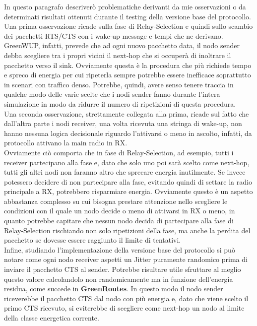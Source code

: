 In questo paragrafo descriverò problematiche derivanti da mie osservazioni o da determinati risultati ottenuti durante il testing della versione base del protocollo.\\

Una prima osservazione ricade sulla fase di Relay-Selection e quindi sullo scambio dei pacchetti RTS/CTS con i wake-up message e tempi che ne derivano. GreenWUP, infatti, prevede che ad ogni nuovo pacchetto data, il nodo sender debba scegliere tra i propri vicini il next-hop che si occuperà di inoltrare il pacchetto verso il sink. Ovviamente questa è la procedura che più richiede tempo e spreco di energia per cui ripeterla sempre potrebbe essere inefficace soprattutto in scenari con traffico denso. Potrebbe, quindi, avere senso tenere traccia in qualche modo delle varie scelte che i nodi sender fanno durante l'intera simulazione in modo da ridurre il numero di ripetizioni di questa procedura.\\

Una seconda osservazione, strettamente collegata alla prima, ricade sul fatto che dall'altra parte i nodi receiver, una volta ricevuta una stringa di wake-up, non hanno nessuna logica decisionale riguardo l'attivarsi o meno in ascolto, infatti, da protocollo attivano la main radio in RX.\\
Ovviamente ciò comporta che in fase di Relay-Selection, ad esempio, tutti i receiver partecipano alla fase e, dato che solo uno poi sarà scelto come next-hop, tutti gli altri nodi non faranno altro che sprecare energia inutilmente. Se invece potessero decidere di non partecipare alla fase, evitando quindi di settare la radio principale a RX, potrebbero risparmiare energia. Ovviamente questo è un aspetto abbastanza complesso su cui bisogna prestare attenzione nello scegliere le condizioni con il quale un nodo decide o meno di attivarsi in RX o meno, in quanto potrebbe capitare che nessun nodo decida di partecipare alla fase di Relay-Selection rischiando non solo ripetizioni della fase, ma anche la perdita del pacchetto se dovesse essere raggiunto il limite di tentativi.\\

Infine, studiando l'implementazione della versione base del protocollo si può notare come ogni nodo receiver aspetti un Jitter puramente randomico prima di inviare il pacchetto CTS al sender. Potrebbe risultare utile sfruttare al meglio questo valore calcolandolo non randomicamente ma in funzione dell'energia residua, come succede in \textbf{GreenRoutes}\cite{greenRoutes}. In questo modo il nodo sender riceverebbe il pacchetto CTS dal nodo con più energia e, dato che viene scelto il primo CTS ricevuto, si eviterebbe di scegliere come next-hop un nodo al limite della classe energetica corrente.